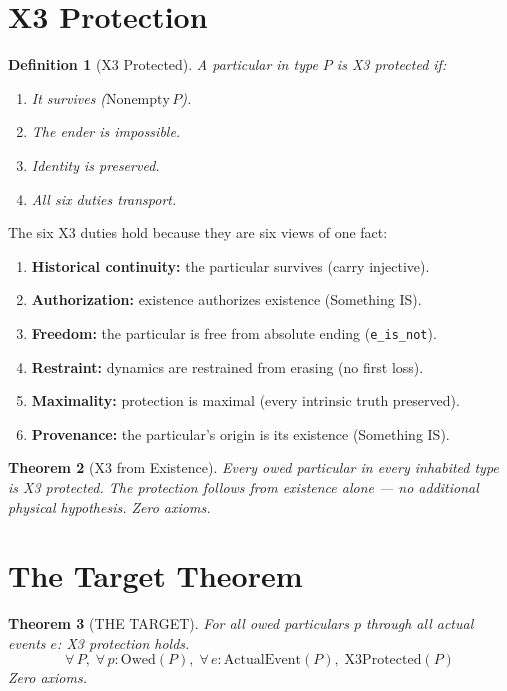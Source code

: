 \documentclass[12pt,a4paper]{article}
\newtheorem{theorem}{Theorem}[section]
\newtheorem{definition}[theorem]{Definition}
\begin{document}
\section{X3 Protection}

\begin{definition}[X3 Protected]
A particular in type $P$ is X3 protected if:
\begin{enumerate}
    \item It survives ($\text{Nonempty}\, P$).
    \item The ender is impossible.
    \item Identity is preserved.
    \item All six duties transport.
\end{enumerate}
\end{definition}

The six X3 duties hold because they are six views of one fact:
\begin{enumerate}
    \item \textbf{Historical continuity:} the particular survives (carry injective).
    \item \textbf{Authorization:} existence authorizes existence (Something IS).
    \item \textbf{Freedom:} the particular is free from absolute ending (\texttt{e\_is\_not}).
    \item \textbf{Restraint:} dynamics are restrained from erasing (no first loss).
    \item \textbf{Maximality:} protection is maximal (every intrinsic truth preserved).
    \item \textbf{Provenance:} the particular's origin is its existence (Something IS).
\end{enumerate}

\begin{theorem}[X3 from Existence]\label{thm:x3}
Every owed particular in every inhabited type is X3 protected.
The protection follows from existence alone --- no additional physical
hypothesis. Zero axioms.
\end{theorem}

\section{The Target Theorem}

\begin{theorem}[THE TARGET]\label{thm:target}
For all owed particulars $p$ through all actual events $e$:
X3 protection holds.
\[
\forall\, P,\; \forall\, p : \text{Owed}(P),\;
\forall\, e : \text{ActualEvent}(P),\;
\text{X3Protected}(P)
\]
Zero axioms.
\end{theorem}
\end{document}
